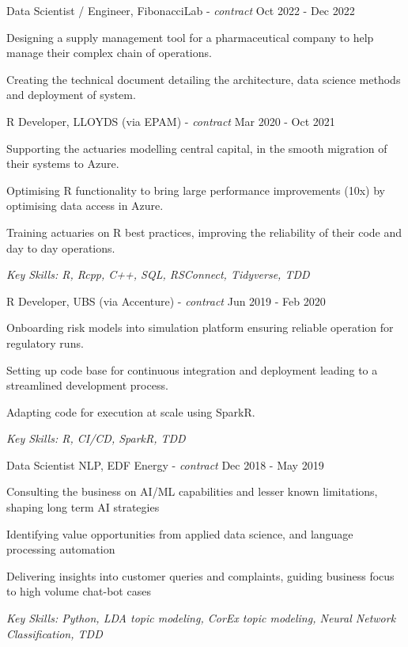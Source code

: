 \documentclass[11pt,article,oneside]{memoir}
\newenvironment{itemize*}{%
  \renewcommand\labelitemi{\textbullet}
  \footnotesize
  \begin{itemize}%
    \setlength{\itemsep}{0pt}}%
  {\end{itemize}
}
\begin{document}
\normalsize
\medskip
\ind Data Scientist / Engineer, FibonacciLab - \emph{contract} \hfill Oct 2022 - Dec 2022
\begin{itemize*}
    \item Designing a supply management tool for a pharmaceutical company to help manage their complex chain of operations.
    \item Creating the technical document detailing the architecture, data science methods and deployment of system. 
\end{itemize*}

\normalsize
\medskip
\ind R Developer, LLOYDS (via EPAM) - \emph{contract} \hfill Mar 2020 - Oct 2021
\begin{itemize*}
    \item Supporting the actuaries modelling central capital, in the smooth migration of their systems to Azure.
    \item Optimising R functionality to bring large performance improvements (10x) by optimising data access in Azure. 
    \item Training actuaries on R best practices, improving the reliability of their code and day to day operations.
\end{itemize*}
\ind \hspace{0.35in} \footnotesize \emph{Key Skills: R, Rcpp, C++, SQL, RSConnect, Tidyverse, TDD}

\normalsize
\medskip
\ind R Developer, UBS (via Accenture) - \emph{contract} \hfill Jun 2019 - Feb 2020
\begin{itemize*}
    \item Onboarding risk models into simulation platform ensuring reliable operation for regulatory runs.
    \item Setting up code base for continuous integration and deployment leading to a streamlined development process.
    \item Adapting code for execution at scale using SparkR.
\end{itemize*}
\ind \hspace{0.35in} \footnotesize \emph{Key Skills: R, CI/CD, SparkR, TDD}

\newpage

\normalsize
\medskip
\ind Data Scientist NLP, EDF Energy - \emph{contract} \hfill Dec 2018 - May 2019
\begin{itemize*}
    \item Consulting the business on AI/ML capabilities and lesser known limitations, shaping long term AI strategies
    \item Identifying value opportunities from applied data science, and language processing automation
    \item Delivering insights into customer queries and complaints, guiding business focus to high volume chat-bot cases
\end{itemize*}
\ind \hspace{0.35in} \footnotesize \emph{Key Skills: Python, LDA topic modeling, CorEx topic modeling, Neural Network Classification, TDD }
\end{document}
